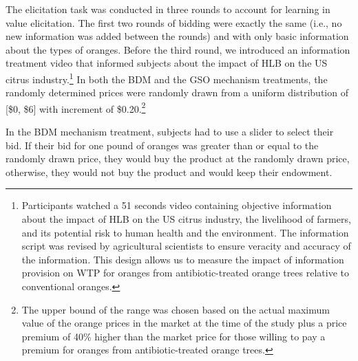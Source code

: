 \documentclass[12pt]{article}
\begin{document}
The elicitation task was conducted in three rounds to account for learning \citep{corrigan2008testing, drichoutis2011role} in value elicitation. The first two rounds of bidding were exactly the same (i.e., no new information was added between the rounds) and with only basic information about the types of oranges. Before the third round, we introduced an information treatment video that informed subjects about the impact of HLB on the US citrus industry.\footnote{Participants watched a 51 seconds video containing objective information about the impact of HLB on the US citrus industry, the livelihood of farmers, and its potential risk to human health and the environment. The information script was revised by agricultural scientists to ensure veracity and accuracy of the information. This design allows us to measure the impact of information provision on WTP for oranges from antibiotic-treated orange trees relative to conventional oranges.}  In both the BDM and the GSO mechanism treatments, the randomly determined prices were randomly drawn from a uniform distribution of [\$0, \$6] with increment of \$0.20.\footnote{The upper bound of the range was chosen based on the actual maximum value of the orange prices in the market at the time of the study plus a price premium of 40\% higher than the market price for those willing to pay a premium for oranges from antibiotic-treated orange trees.}

In the BDM mechanism treatment, subjects had to use a slider to select their bid. If their bid for one pound of oranges was greater than or equal to the randomly drawn price, they would buy the product at the randomly drawn price, otherwise, they would not buy the product and would keep their endowment. 

\end{document}
